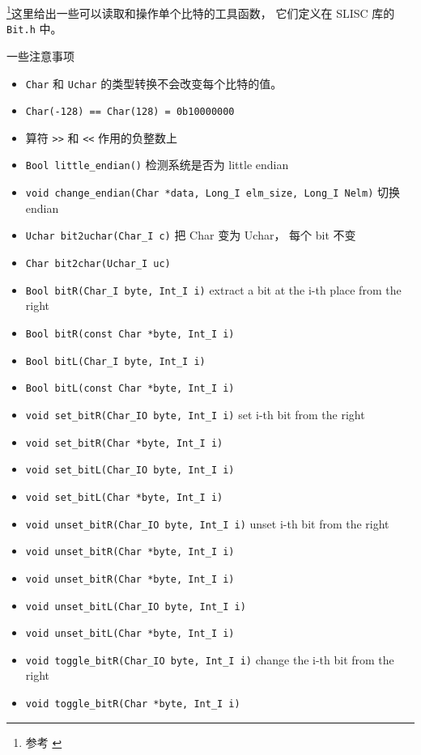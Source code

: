 
\footnote{参考 \cite{NR3}}这里给出一些可以读取和操作单个比特的工具函数， 它们定义在 SLISC 库的 \verb|Bit.h| 中。

一些注意事项
\begin{itemize}
\item \verb|Char| 和 \verb|Uchar| 的类型转换不会改变每个比特的值。
\item \verb|Char(-128) == Char(128) = 0b10000000|
\item 算符 \verb|>>| 和 \verb|<<| 作用的负整数上
\end{itemize}

\begin{itemize}
\item \verb|Bool little_endian()| 检测系统是否为 little endian
\item \verb|void change_endian(Char *data, Long_I elm_size, Long_I Nelm)| 切换 endian
\item \verb|Uchar bit2uchar(Char_I c)| 把 Char 变为 Uchar， 每个 bit 不变
\item \verb|Char bit2char(Uchar_I uc)|
\item \verb|Bool bitR(Char_I byte, Int_I i)| extract a bit at the i-th place from the right
\item \verb|Bool bitR(const Char *byte, Int_I i)|
\item \verb|Bool bitL(Char_I byte, Int_I i)|
\item \verb|Bool bitL(const Char *byte, Int_I i)|
\item \verb|void set_bitR(Char_IO byte, Int_I i)| set i-th bit from the right
\item \verb|void set_bitR(Char *byte, Int_I i)|
\item \verb|void set_bitL(Char_IO byte, Int_I i)|
\item \verb|void set_bitL(Char *byte, Int_I i)|
\item \verb|void unset_bitR(Char_IO byte, Int_I i)| unset i-th bit from the right
\item \verb|void unset_bitR(Char *byte, Int_I i)|
\item \verb|void unset_bitR(Char *byte, Int_I i)|
\item \verb|void unset_bitL(Char_IO byte, Int_I i)|
\item \verb|void unset_bitL(Char *byte, Int_I i)|
\item \verb|void toggle_bitR(Char_IO byte, Int_I i)| change the i-th bit from the right
\item \verb|void toggle_bitR(Char *byte, Int_I i)|

\end{itemize}
